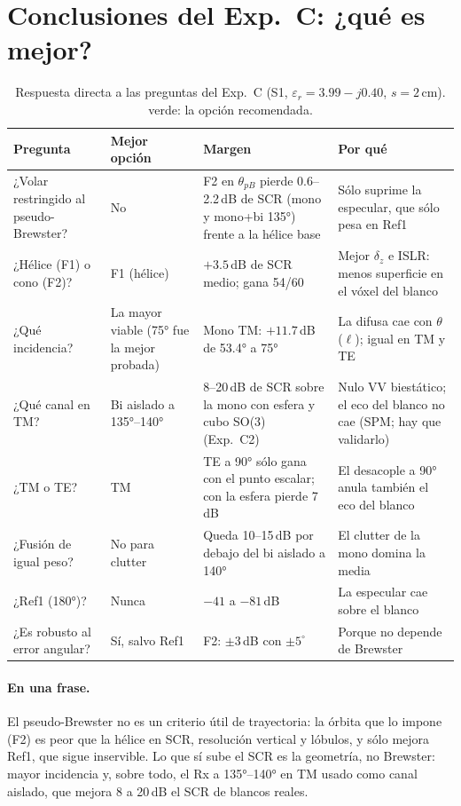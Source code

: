 \section{Conclusiones del Exp.~C: ¿qué es mejor?}

\begin{table}[H]
\centering\small
\caption{Respuesta directa a las preguntas del Exp.~C (S1, $\varepsilon_r=3.99-j0.40$, $s=2$\,cm).
\colorbox{mejor}{verde}: la opción recomendada.}
\label{tab:C_concl}
\begin{tabular}{@{}L{3.6cm}L{3.2cm}L{3.4cm}L{4.4cm}@{}}
\toprule
\textbf{Pregunta} & \textbf{Mejor opción} & \textbf{Margen} & \textbf{Por qué} \\
\midrule
¿Volar restringido al pseudo-Brewster? & No & F2 en $\theta_{pB}$ pierde 0.6--2.2\,dB de SCR (mono y mono+bi 135°) frente a la hélice base &
Sólo suprime la especular, que sólo pesa en Ref1 \\
¿Hélice (F1) o cono (F2)? & F1 (hélice) & $+3.5$\,dB de SCR medio; gana 54/60 &
Mejor $\delta_z$ e ISLR: menos superficie en el vóxel del blanco \\
¿Qué incidencia? & La mayor viable (75° fue la mejor probada) & Mono TM: $+11.7$\,dB de 53.4° a 75° &
La difusa cae con $\theta$ ($\ell$); igual en TM y TE \\
¿Qué canal en TM? & Bi aislado a 135°--140° & 8--20\,dB de SCR sobre la mono con esfera y cubo SO(3) (Exp.~C2) & Nulo VV biestático; el eco del blanco no cae (SPM; hay que validarlo) \\
¿TM o TE? & TM & TE a 90° sólo gana con el punto escalar; con la esfera pierde 7\,dB & El desacople a 90° anula también el eco del blanco \\
¿Fusión de igual peso? & No para clutter & Queda 10--15\,dB por debajo del bi aislado a 140° & El clutter de la mono domina la media \\
¿Ref1 (180°)? & Nunca & $-41$ a $-81$\,dB & La especular cae sobre el blanco \\
¿Es robusto al error angular? & Sí, salvo Ref1 & F2: $\pm3$\,dB con $\pm5^{\circ}$ & Porque no depende de Brewster \\
\bottomrule
\end{tabular}
\end{table}

\paragraph{En una frase.} El pseudo-Brewster no es un criterio útil de trayectoria: la órbita
que lo impone (F2) es peor que la hélice en SCR, resolución vertical y lóbulos, y sólo mejora
Ref1, que sigue inservible. Lo que sí sube el SCR es la geometría, no Brewster: mayor incidencia y, sobre todo,
el Rx a 135°--140° en TM usado como canal aislado, que mejora 8 a 20\,dB el SCR de blancos reales.

